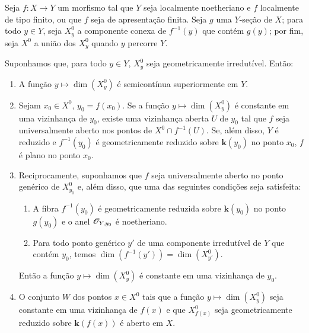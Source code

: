 \begin{proposition}[15.6.6]
\label{IV.15.6.6}
Seja $f:X\to Y$ um morfismo tal que $Y$ seja localmente noetheriano e $f$ localmente de tipo finito, ou que $f$ seja de apresentação finita. Seja $g$ uma $Y$-seção de $X$; para todo $y\in Y$, seja $X_y^0$ a componente conexa de $f^{-1}(y)$ que contém $g(y)$; por fim, seja $X^0$ a união dos $X_y^0$ quando $y$ percorre $Y$.

Suponhamos que, para todo $y\in Y$, $X_y^0$ seja geometricamente irredutível. Então:
\begin{enumerate}[label=\emph{(\roman*)}]
  \item A função $y\mapsto\dim(X_y^0)$ é semicontínua superiormente em $Y$.
  \item Sejam $x_0\in X^0$, $y_0=f(x_0)$. Se a função $y\mapsto\dim(X_y^0)$ é constante em uma vizinhança de $y_0$, existe uma vizinhança aberta $U$ de $y_0$ tal que $f$ seja universalmente aberto nos pontos de $X^0\cap f^{-1}(U)$. Se, além disso, $Y$ é reduzido e $f^{-1}(y_0)$ é geometricamente reduzido sobre $\mathbf{k}(y_0)$ no ponto $x_0$, $f$ é plano no ponto $x_0$.
  \item Reciprocamente, suponhamos que $f$ seja universalmente aberto no ponto genérico de $X_{y_0}^0$ e, além disso, que uma das seguintes condições seja satisfeita:
  \begin{enumerate}
    \item[$\alpha$)] A fibra $f^{-1}(y_0)$ é geometricamente reduzida sobre $\mathbf{k}(y_0)$ no ponto $g(y_0)$ e o anel $\mathscr{O}_{Y,y_0}$ é noetheriano.
    \item[$\beta$)] Para todo ponto genérico $y'$ de uma componente irredutível de $Y$ que contém $y_0$, temos $\dim(f^{-1}(y'))=\dim(X_{y'}^0)$.
  \end{enumerate}
  Então a função $y\mapsto\dim(X_y^0)$ é constante em uma vizinhança de $y_0$.
  \item O conjunto $W$ dos pontos $x\in X^0$ tais que a função $y\mapsto\dim(X_y^0)$ seja constante em uma vizinhança de $f(x)$ e que $X_{f(x)}^0$ seja geometricamente reduzido sobre $\mathbf{k}(f(x))$ é aberto em $X$.
\end{enumerate}
\end{proposition}

